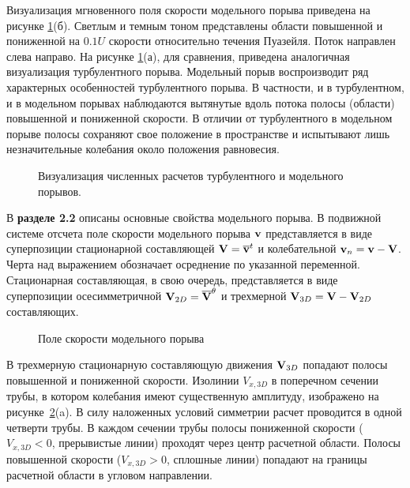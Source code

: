 Визуализация мгновенного поля скорости модельного порыва приведена на рисунке \ref{3D_img}(б). Светлым и темным тоном представлены области повышенной и пониженной на $0.1U$ скорости относительно течения Пуазейля. Поток направлен слева направо. На рисунке \ref{3D_img}(а), для сравнения, приведена аналогичная визуализация турбулентного порыва. Модельный порыв воспроизводит ряд характерных особенностей турбулентного порыва. В частности, и в турбулентном, и в модельном порывах наблюдаются вытянутые вдоль потока полосы (области) повышенной и пониженной скорости. В отличии от турбулентного в модельном порыве полосы сохраняют свое положение в пространстве и испытывают лишь незначительные колебания около положения равновесия. 

\begin{figure}[h]
\caption{Визуализация численных расчетов турбулентного и модельного порывов.}
\label{3D_img}
\end{figure}


В \textbf{разделе 2.2} описаны основные свойства модельного порыва. В подвижной системе отсчета поле скорости модельного порыва $\mathbf{v}$ представляется в виде суперпозиции стационарной составляющей $\mathbf{V} = \overline{\mathbf{v}}^t$ и колебательной $\mathbf{v}_n = \mathbf{v} - \mathbf{V}$. Черта над выражением обозначает осреднение по указанной переменной. Стационарная составляющая, в свою очередь, представляется в виде суперпозиции осесимметричной $\mathbf{V}_{2D} = \overline{\mathbf{V}}^{\theta}$ и трехмерной $\mathbf{V}_{3D} = \mathbf{V} - \mathbf{V}_{2D}$ составляющих. 

\begin{figure}[h]
\caption{Поле скорости модельного порыва}
\label{mp_cs_pic}
\end{figure}

В трехмерную стационарную составляющую движения $\mathbf{V}_{3D}$ попадают полосы повышенной и пониженной скорости. Изолинии $V_{x, 3D}$ в поперечном сечении трубы, в котором колебания имеют существенную амплитуду, изображено на рисунке~\ref{mp_cs_pic}(a). В силу наложенных условий симметрии расчет проводится в одной четверти трубы. В каждом сечении трубы полосы пониженной скорости ($V_{x,3D} < 0$, прерывистые линии) проходят через центр расчетной области. Полосы повышенной скорости ($V_{x,3D} > 0$, сплошные линии) попадают на границы расчетной области в угловом направлении. 

